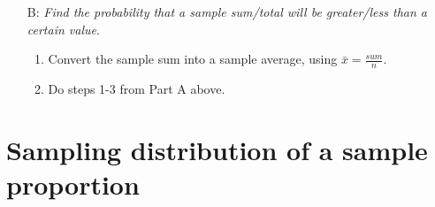 \begin{itemize}
\begin{itemize}
\item[B:] \textit{Find the probability that a sample sum/total will be greater/less than a certain value}.
\begin{enumerate}\vspace{-1mm}
\setlength{\itemsep}{0mm}
\item Convert the sample sum into a sample average, using $\bar{x} = \frac{sum}{n}$.  
\item Do steps 1-3 from Part A above.
\end{enumerate}
\end{itemize}
\end{itemize}

{}




\section[Sampling distribution of a sample proportion]{Sampling distribution of a sample proportion }
\label{distributionphat}

